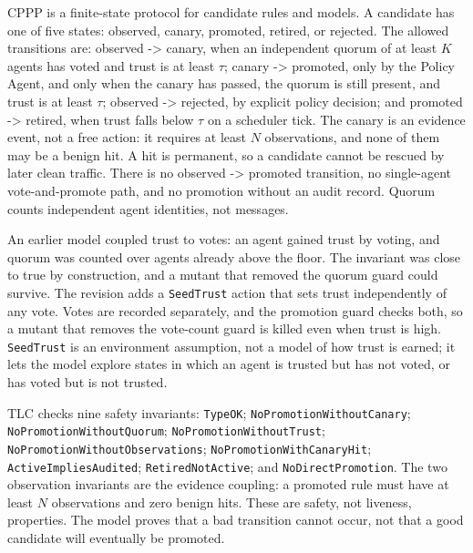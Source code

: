 \documentclass[preprint,11pt]{elsarticle}
\begin{document}
CPPP is a finite-state protocol for candidate rules and models. A
candidate has one of five states: observed, canary, promoted, retired,
or rejected. The allowed transitions are: observed -\textgreater{}
canary, when an independent quorum of at least \(K\) agents has voted
and trust is at least \(\tau\); canary -\textgreater{} promoted, only by
the Policy Agent, and only when the canary has passed, the quorum is
still present, and trust is at least \(\tau\); observed -\textgreater{}
rejected, by explicit policy decision; and promoted -\textgreater{}
retired, when trust falls below \(\tau\) on a scheduler tick. The canary
is an evidence event, not a free action: it requires at least \(N\)
observations, and none of them may be a benign hit. A hit is permanent,
so a candidate cannot be rescued by later clean traffic. There is no
observed -\textgreater{} promoted transition, no single-agent
vote-and-promote path, and no promotion without an audit record. Quorum
counts independent agent identities, not messages.

An earlier model coupled trust to votes: an agent gained trust by
voting, and quorum was counted over agents already above the floor. The
invariant was close to true by construction, and a mutant that removed
the quorum guard could survive. The revision adds a \texttt{Seed\allowbreak{}Trust}
action that sets trust independently of any vote. Votes are recorded
separately, and the promotion guard checks both, so a mutant that
removes the vote-count guard is killed even when trust is high.
\texttt{Seed\allowbreak{}Trust} is an environment assumption, not a model of how
trust is earned; it lets the model explore states in which an agent is
trusted but has not voted, or has voted but is not trusted.

TLC checks nine safety invariants: \texttt{Type\allowbreak{}OK};
\texttt{No\allowbreak{}Promotion\allowbreak{}Without\allowbreak{}Canary}; \texttt{No\allowbreak{}Promotion\allowbreak{}Without\allowbreak{}Quorum};
\texttt{No\allowbreak{}Promotion\allowbreak{}Without\allowbreak{}Trust};
\texttt{No\allowbreak{}Promotion\allowbreak{}Without\allowbreak{}Observations};
\texttt{No\allowbreak{}Promotion\allowbreak{}With\allowbreak{}Canary\allowbreak{}Hit}; \texttt{Active\allowbreak{}Implies\allowbreak{}Audited};
\texttt{Retired\allowbreak{}Not\allowbreak{}Active}; and \texttt{No\allowbreak{}Direct\allowbreak{}Promotion}. The two
observation invariants are the evidence coupling: a promoted rule must
have at least \(N\) observations and zero benign hits. These are safety,
not liveness, properties. The model proves that a bad transition cannot
occur, not that a good candidate will eventually be promoted.
\end{document}
